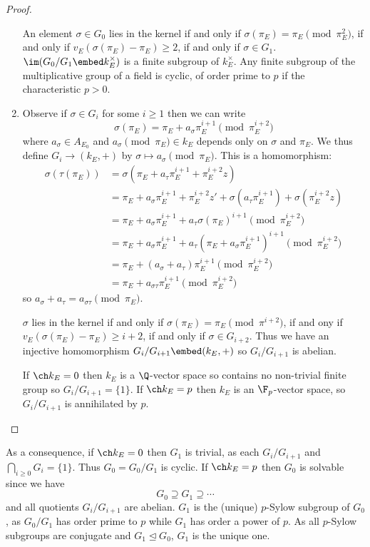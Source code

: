 \documentclass[a4paper]{article}
\begin{document}
\begin{proof}
\begin{enumerate}
    An element \(\sigma \in G_0\) lies in the kernel if and only if \(\sigma(\pi_E) = \pi_E \pmod{\pi_E^2}\), if and only if \(v_E(\sigma(\pi_E) - \pi_E) \geq 2\), if and only if \(\sigma \in G_1\). \(\im (G_0/G_1 \embed k_E^\times)\) is a finite subgroup of \(k_E^\times\). Any finite subgroup of the multiplicative group of a field is cyclic, of order prime to \(p\) if the characteristic \(p > 0\).
  \item Observe if \(\sigma \in G_i\) for some \(i \geq 1\) then we can write
    \[
      \sigma(\pi_E) = \pi_E + a_\sigma \pi_E^{i + 1} \pmod{\pi_E^{i + 2}}
    \]
    where \(a_\sigma \in A_{E_0}\) and \(a_\sigma \pmod{\pi_E} \in k_E\) depends only on \(\sigma\) and \(\pi_E\). We thus define \(G_i \to (k_E, +)\) by \(\sigma \mapsto a_\sigma \pmod{\pi_E}\). This is a homomorphism:
    \begin{align*}
      \sigma(\tau(\pi_E))
      &= \sigma(\pi_E + a_\tau \pi_E^{i + 1} + \pi_E^{i + 2} z) \\
      &= \pi_E + a_\sigma \pi_E^{i + 1} + \pi_E^{i + 2} z' + \sigma(a_\tau \pi_E^{i + 1}) + \sigma(\pi_E^{i + 2} z) \\
      &= \pi_E + a_\sigma \pi_E^{i + 1} + a_\tau \sigma(\pi_E)^{i + 1} \pmod{\pi_E^{i + 2}} \\
      &= \pi_E + a_\sigma \pi_E^{i + 1} + a_\tau(\pi_E + a_\sigma \pi_E^{i + 1})^{i + 1} \pmod{\pi_E^{i + 2}} \\
      &= \pi_E + (a_\sigma + a_\tau) \pi_E^{i + 1} \pmod{\pi_E^{i + 2}} \\
      &= \pi_E + a_{\sigma\tau} \pi_E^{i + 1} \pmod{\pi_E^{i + 2}}
    \end{align*}
    so \(a_\sigma + a_\tau = a_{\sigma\tau} \pmod{\pi_E}\).

    \(\sigma\) lies in the kernel if and only if \(\sigma(\pi_E) = \pi_E \pmod{\pi^{i + 2}}\), if and ony if \(v_E(\sigma(\pi_E) - \pi_E) \geq i + 2\), if and only if \(\sigma \in G_{i + 2}\). Thus we have an injective homomorphism \(G_i/G_{i + 1} \embed (k_E, +)\) so \(G_i/G_{i + 1}\) is abelian.

    If \(\ch k_E = 0\) then \(k_E\) is a \(\Q\)-vector space so contains no non-trivial finite group so \(G_i/G_{i + 1} = \{1\}\). If \(\ch k_E = p\) then \(k_E\) is an \(\F_p\)-vector space, so \(G_i/G_{i + 1}\) is annihilated by \(p\).
  \end{enumerate}
\end{proof}

As a consequence, if \(\ch k_E = 0\) then \(G_1\) is trivial, as each \(G_i/G_{i + 1}\) and \(\bigcap_{i \geq 0} G_i = \{1\}\). Thus \(G_0 = G_0/G_1\) is cyclic. If \(\ch k_E = p\) then \(G_0\) is solvable since we have
\[
  G_0 \supseteq G_1 \supseteq \cdots
\]
and all quotients \(G_i/G_{i + 1}\) are abelian. \(G_1\) is the (unique) \(p\)-Sylow subgroup of \(G_0\), as \(G_0/G_1\) has order prime to \(p\) while \(G_1\) has order a power of \(p\). As all \(p\)-Sylow subgroups are conjugate and \(G_1 \trianglelefteq G_0\), \(G_1\) is the unique one.
\end{document}
